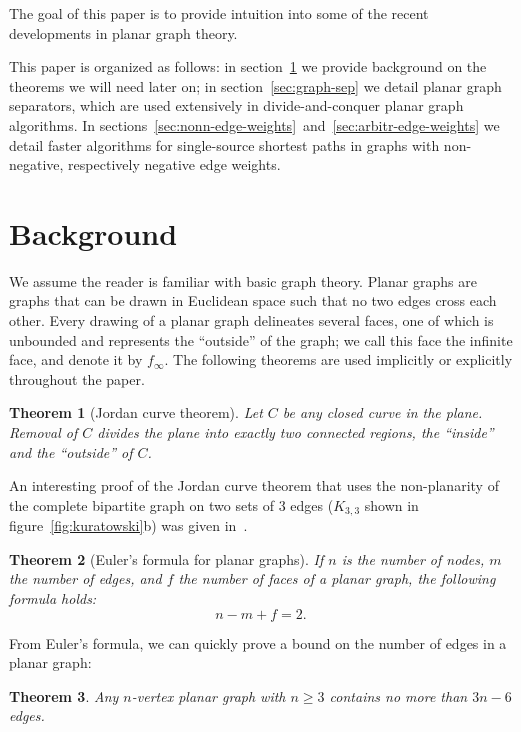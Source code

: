 \documentclass[11pt]{article}
\newtheorem{theorem}{Theorem}[section]
\begin{document}
The goal of this paper is to provide intuition into some of the recent developments in planar graph theory.

This paper is organized as follows: in section~\ref{sec:background} we provide background on the theorems we will need later on; in section~\ref{sec:graph-sep} we detail planar graph separators, which are used extensively in divide-and-conquer planar graph algorithms. In sections~\ref{sec:nonn-edge-weights}~and~\ref{sec:arbitr-edge-weights} we detail faster algorithms for single-source shortest paths in graphs with non-negative, respectively negative edge weights.

\section{Background}
\label{sec:background}

We assume the reader is familiar with basic graph theory. Planar graphs are graphs that can be drawn in Euclidean space such that no two edges cross each other. Every drawing of a planar graph delineates several faces, one of which is unbounded and represents the ``outside'' of the graph; we call this face the infinite face, and denote it by $f_{\infty}$. The following theorems are used implicitly or explicitly throughout the paper.\\

\begin{theorem}[Jordan curve theorem]
  Let $C$ be any closed curve in the plane. Removal of $C$ divides the plane into exactly two connected regions, the ``inside'' and the ``outside'' of $C$.
\end{theorem}

An interesting proof of the Jordan curve theorem that uses the non-planarity of the complete bipartite graph on two sets of 3 edges ($K_{3,3}$ shown in figure~\ref{fig:kuratowski}b) was given in~\cite{thomassen1992jordan}.\\

\begin{theorem}[Euler's formula for planar graphs]
  If $n$ is the number of nodes, $m$ the number of edges, and $f$ the number of faces of a planar graph, the following formula holds:
\[
  n - m + f = 2.
\]
\end{theorem}

From Euler's formula, we can quickly prove a bound on the number of edges in a planar graph:\\

\begin{theorem}
  Any $n$-vertex planar graph with $n \geq 3$ contains no more than $3n-6$ edges.\\
\end{theorem}
\end{document}
